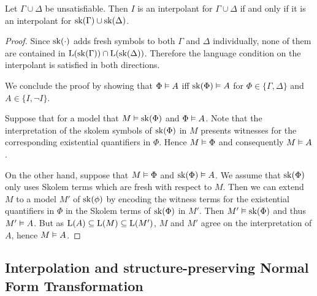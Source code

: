 \begin{prop}
	\label{prop:sk_interpolant}
	Let $\Gamma \cup \Delta$ be unsatisfiable.
	Then $I$ is an interpolant for $\Gamma \cup \Delta$ if and only if it is an interpolant for $\operatorname{sk}(\Gamma) \cup \operatorname{sk}(\Delta)$. 
\end{prop}

\begin{proof}
	Since $\operatorname{sk}(\cdot)$ adds fresh symbols to both $\Gamma$ and $\Delta$ individually,
	none of them are contained in $\operatorname{L}(\operatorname{sk}(\Gamma)) \cap \operatorname{L}(\operatorname{sk}(\Delta))$.
	Therefore the language condition on the interpolant is satisfied in both directions.



	We conclude the proof by showing that $\Phi \vDash A$ iff $\operatorname{sk}(\Phi) \vDash A$ for $\Phi \in \{\Gamma, \Delta\}$ and $A \in \{I, \lnot I\}$.

	Suppose that for a model that $M \vDash \operatorname{sk}(\Phi)$ and $\Phi \vDash A$.
	Note that the interpretation of the skolem symbols of $\operatorname{sk}(\Phi)$ in $M$ presents witnesses for the corresponding existential quantifiers in $\Phi$.
	Hence $M \vDash \Phi$ and consequently $M\vDash A$.

	On the other hand, suppose that $M \vDash \Phi$ and $\operatorname{sk}(\Phi) \vDash A$.
	We assume that $\operatorname{sk}(\Phi)$ only uses Skolem terms which are fresh with respect to $M$.
	Then we can extend $M$ to a model $M'$ of $\operatorname{sk}(\phi)$ by encoding the witness terms for the existential quantifiers in $\Phi$ in the Skolem terms of $\operatorname{sk}(\Phi)$ in $M'$.
	Then $M' \vDash \operatorname{sk}(\Phi)$ and thus $M' \vDash A$.
	But as $\operatorname{L}(A) \subseteq \operatorname{L}(M) \subseteq \operatorname{L}(M')$, $M$ and $M'$ agree on the interpretation of $A$, hence $M \vDash A$.
\end{proof}


\subsection{Interpolation and structure-preserving Normal Form Transformation}

